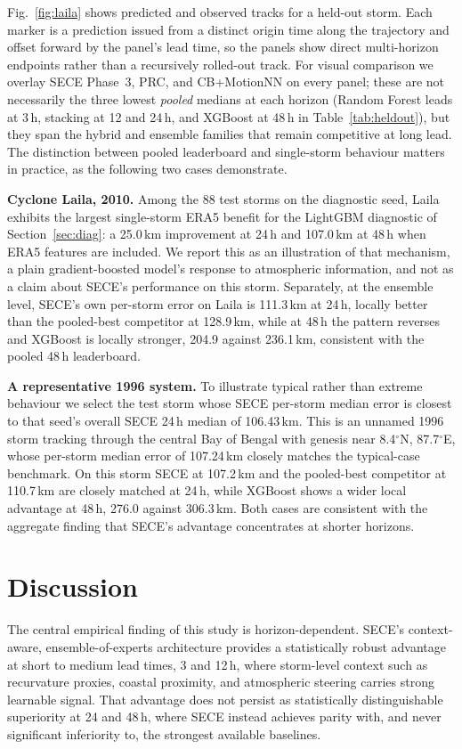 \documentclass[10pt,twocolumn,a4paper]{article}
\newcommand{\sece}{SECE}
\newcommand{\bob}{Bay of Bengal}
\newcommand{\era}{ERA5}
\begin{document}
Fig.~\ref{fig:laila} shows predicted and observed tracks for a held-out storm.
Each marker is a prediction issued from a distinct origin time along the
trajectory and offset forward by the panel's lead time, so the panels show direct
multi-horizon endpoints rather than a recursively rolled-out track. For visual
comparison we overlay \sece{} Phase~3, PRC, and CB+MotionNN on every panel; these
are not necessarily the three lowest \emph{pooled} medians at each horizon (Random
Forest leads at 3\,h, stacking at 12 and 24\,h, and XGBoost at 48\,h in
Table~\ref{tab:heldout}), but they span the hybrid and ensemble families that
remain competitive at long lead. The distinction between pooled leaderboard and
single-storm behaviour matters in practice, as the following two cases demonstrate.

\textbf{Cyclone Laila, 2010.} Among the 88 test storms on the diagnostic seed,
Laila exhibits the largest single-storm \era{} benefit for the LightGBM diagnostic
of Section~\ref{sec:diag}: a 25.0\,km improvement at 24\,h and 107.0\,km at 48\,h
when \era{} features are included. We report this as an illustration of that
mechanism, a plain gradient-boosted model's response to atmospheric information,
and not as a claim about \sece{}'s performance on this storm. Separately, at the
ensemble level, \sece{}'s own per-storm error on Laila is 111.3\,km at 24\,h,
locally better than the pooled-best competitor at 128.9\,km, while at 48\,h the
pattern reverses and XGBoost is locally stronger, 204.9 against 236.1\,km,
consistent with the pooled 48\,h leaderboard.

\textbf{A representative 1996 system.} To illustrate typical rather than extreme
behaviour we select the test storm whose \sece{} per-storm median error is closest
to that seed's overall \sece{} 24\,h median of 106.43\,km. This is an unnamed 1996
storm tracking through the central \bob{} with genesis near 8.4$^\circ$N,
87.7$^\circ$E, whose per-storm median error of 107.24\,km closely matches the
typical-case benchmark. On this storm \sece{} at 107.2\,km and the pooled-best
competitor at 110.7\,km are closely matched at 24\,h, while XGBoost shows a wider
local advantage at 48\,h, 276.0 against 306.3\,km. Both cases are consistent with
the aggregate finding that \sece{}'s advantage concentrates at shorter horizons.

\section{Discussion}
\label{sec:discussion}
The central empirical finding of this study is horizon-dependent. \sece{}'s
context-aware, ensemble-of-experts architecture provides a statistically robust
advantage at short to medium lead times, 3 and 12\,h, where storm-level context
such as recurvature proxies, coastal proximity, and atmospheric steering carries
strong learnable signal. That advantage does not persist as statistically
distinguishable superiority at 24 and 48\,h, where \sece{} instead achieves parity
with, and never significant inferiority to, the strongest available baselines.
\end{document}
